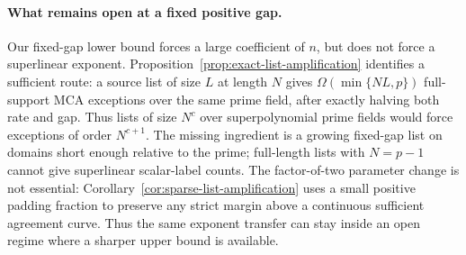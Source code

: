 \documentclass[11pt,letterpaper]{article}
\theoremstyle{definition}
\theoremstyle{remark}
\begin{document}
\paragraph{What remains open at a fixed positive gap.}
Our fixed-gap lower bound forces a large coefficient of $n$, but does
not force a superlinear exponent. Proposition~\ref{prop:exact-list-amplification}
identifies a sufficient route: a source list of size $L$ at length $N$
gives $\Omega(\min\{NL,p\})$ full-support MCA exceptions over the same
prime field, after exactly halving both rate and gap. Thus lists of size
$N^c$ over superpolynomial prime fields would force exceptions of order
$N^{c+1}$. The missing ingredient is a growing fixed-gap list on domains short
enough relative to the prime; full-length lists with $N=p-1$ cannot give superlinear scalar-label counts.
The factor-of-two parameter change is not essential:
Corollary~\ref{cor:sparse-list-amplification} uses a small positive
padding fraction to preserve any strict margin above a continuous
sufficient agreement curve. Thus the same exponent transfer can stay
inside an open regime where a sharper upper bound is available.
\end{document}
